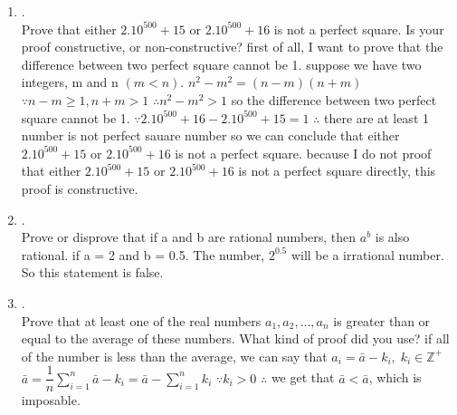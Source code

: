\documentclass{article}
\theoremstyle{definition}
\theoremstyle{plain}
\begin{document}
\begin {enumerate}[itemindent=30pt,label=\bf Exercise {\arabic*}:]
\paragraph{2)}
$q \to p$
\subitem we can proof it by contrapositive, so we should prove that $\neg p \to \neg q$ is true.
\subitem if n is odd, we can assume that $n = 2k + 1, k \in \mathbb{Z}$
\subitem $\therefore 7n + 4 = 14k + 11$ 
\subitem $\because 14k + 4 mod 2 \equiv 1$
\subitem $\therefore \neg q$ is true
\subitem $\therefore \neg p \to \neg q$ is true
\subitem $\therefore q \to p$ is true
\subitem in the case that $(q \to p) \land (p \to q)$ is true, we can conclude that $p \leftrightarrow q$ is true
\subitem so n is even if and only if 7n+4 is even.
\newpage

\item .\\
Prove that either $2.10^{500} + 15$ or $2.10^{500}+ 16$ is not a perfect square. Is your proof constructive, or non-constructive?
\subitem first of all, I want to prove that the difference between two perfect square cannot be 1.
\subitem suppose we have two integers, m and n $(m < n)$. 
\subitem $n^{2} - m^{2} = (n-m)(n+m)$
\subitem $\because n-m \geqslant 1, n + m > 1$
\subitem $\therefore n^{2} - m^{2} > 1$
\subitem so the difference between two perfect square cannot be 1.
\subitem $\because 2.10^{500} + 16 - 2.10^{500}+ 15 = 1$
\subitem $\therefore$ there are at least 1 number is not perfect sauare number
\subitem so we can conclude that either $2.10^{500} + 15$ or $2.10^{500}+ 16$ is not a perfect square.
\subitem because I do not proof that either $2.10^{500} + 15$ or $2.10^{500}+ 16$ is not a perfect square directly, this proof is constructive. 
\\
\item .\\
Prove or disprove that if a and b are rational numbers, then $a^{b}$ is also rational.
\subitem if a = 2 and b = 0.5.  The number, $2^{0.5}$ will be a irrational number. So this statement is false. 
\item .\\
Prove that at least one of the real numbers $a_{1}, a_{2}, ..., a_{n}$ is greater than or equal to the average of these numbers. What kind of proof did you use?
\subitem if all of the number is less than the average, we can say that $a_{i} = \bar{a} - k_{i},\;k_{i} \in \mathbb{Z}^{+}$
\subitem $\bar{a} = \dfrac{1}{n} \sum\limits_{i=1}^n \bar{a} - k_{i} = \bar{a} - \sum\limits_{i=1}^n k_{i} $
\subitem $\because k_{i} > 0$
\subitem $\therefore$ we get that $\bar{a} < \bar{a}$, which is imposable.

\end{enumerate}
\end{document}
